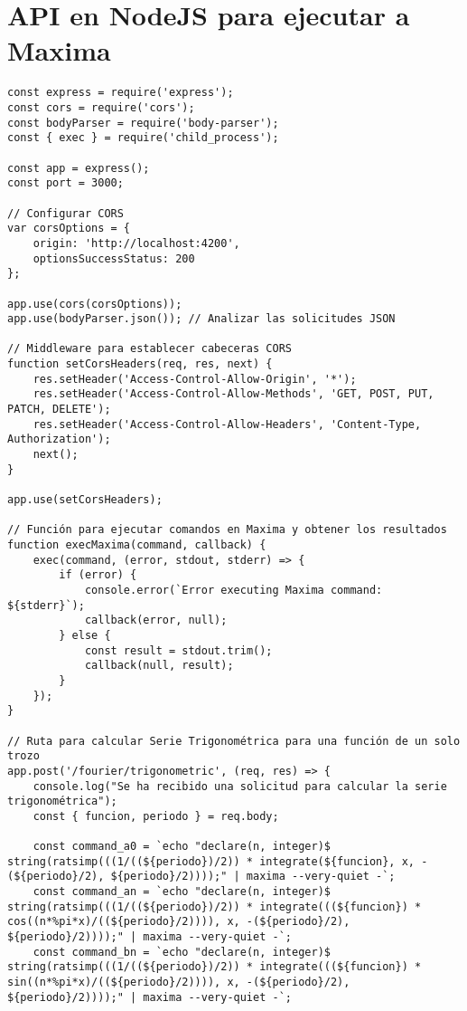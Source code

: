 \section{API en NodeJS para ejecutar a Maxima} \label{app3:API_nodejs}
\begin{longlisting}
	\begin{verbatim}
const express = require('express');
const cors = require('cors');
const bodyParser = require('body-parser');
const { exec } = require('child_process');

const app = express();
const port = 3000;

// Configurar CORS
var corsOptions = {
	origin: 'http://localhost:4200',
	optionsSuccessStatus: 200
};

app.use(cors(corsOptions));
app.use(bodyParser.json()); // Analizar las solicitudes JSON

// Middleware para establecer cabeceras CORS
function setCorsHeaders(req, res, next) {
	res.setHeader('Access-Control-Allow-Origin', '*');
	res.setHeader('Access-Control-Allow-Methods', 'GET, POST, PUT, PATCH, DELETE');
	res.setHeader('Access-Control-Allow-Headers', 'Content-Type, Authorization');
	next();
}

app.use(setCorsHeaders);

// Función para ejecutar comandos en Maxima y obtener los resultados
function execMaxima(command, callback) {
	exec(command, (error, stdout, stderr) => {
		if (error) {
			console.error(`Error executing Maxima command: ${stderr}`);
			callback(error, null);
		} else {
			const result = stdout.trim();
			callback(null, result);
		}
	});
}

// Ruta para calcular Serie Trigonométrica para una función de un solo trozo
app.post('/fourier/trigonometric', (req, res) => {
	console.log("Se ha recibido una solicitud para calcular la serie trigonométrica");
	const { funcion, periodo } = req.body;
	
	const command_a0 = `echo "declare(n, integer)$ string(ratsimp(((1/((${periodo})/2)) * integrate(${funcion}, x, -(${periodo}/2), ${periodo}/2))));" | maxima --very-quiet -`;
	const command_an = `echo "declare(n, integer)$ string(ratsimp(((1/((${periodo})/2)) * integrate(((${funcion}) * cos((n*%pi*x)/((${periodo}/2)))), x, -(${periodo}/2), ${periodo}/2))));" | maxima --very-quiet -`;
	const command_bn = `echo "declare(n, integer)$ string(ratsimp(((1/((${periodo})/2)) * integrate(((${funcion}) * sin((n*%pi*x)/((${periodo}/2)))), x, -(${periodo}/2), ${periodo}/2))));" | maxima --very-quiet -`;
	

\end{verbatim}
\end{longlisting}
